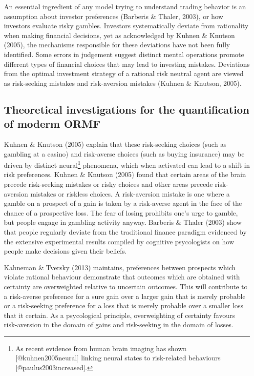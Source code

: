 \documentclass{DissertateUSU}
\begin{document}
An essential ingredient of any model trying to understand trading
behavior is an assumption about investor preferences (Barberis \&
Thaler, 2003), or how investors evaluate risky gambles. Investors
systematically deviate from rationality when making financial decisions,
yet as acknowledged by Kuhnen \& Knutson (2005), the mechanisms
responsible for these deviations have not been fully identified. Some
errors in judgement suggest distinct mental operations promote different
types of financial choices that may lead to investing mistakes.
Deviations from the optimal investment strategy of a rational risk
neutral agent are viewed as risk-seeking mistakes and risk-aversion
mistakes (Kuhnen \& Knutson, 2005).\medskip 

\subsection{Theoretical investigations for the quantification of moderm ORMF}

Kuhnen \& Knutson (2005) explain that these risk-seeking choices (such
as gambling at a casino) and risk-averse choices (such as buying
insurance) may be driven by distinct
neural\footnote{As recent evidence from human brain imaging has shown [@kuhnen2005neural] linking neural states to risk-related behaviours [@paulus2003increased].}
phenomena, which when activated can lead to a shift in risk preferences.
Kuhnen \& Knutson (2005) found that certain areas of the brain precede
risk-seeking mistakes or risky choices and other areas precede
risk-aversion mistakes or riskless choices. A risk-aversion mistake is
one where a gamble on a prospect of a gain is taken by a risk-averse
agent in the face of the chance of a prospective loss. The fear of
losing prohibits one's urge to gamble, but people engage in gambling
activity anyway. Barberis \& Thaler (2003) show that people regularly
deviate from the traditional finance paradigm evidenced by the extensive
experimental results compiled by cognitive psycologists on how people
make decisions given their beliefs.\medskip 

Kahneman \& Tversky (2013) maintains, preferences between prospects
which violate rational behaviour demonstrate that outcomes which are
obtained with certainty are overweighted relative to uncertain outcomes.
This will contribute to a risk-averse preference for a sure gain over a
larger gain that is merely probable or a risk-seeking preference for a
loss that is merely probable over a smaller loss that it certain. As a
psycological principle, overweighting of certainty favours risk-aversion
in the domain of gains and risk-seeking in the domain of losses.\medskip
\end{document}
